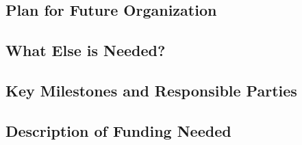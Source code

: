 \subsection{Plan for Future Organization}






\subsection{What Else is Needed?}






\subsection{Key Milestones and Responsible Parties}






\subsection{Description of Funding Needed}




